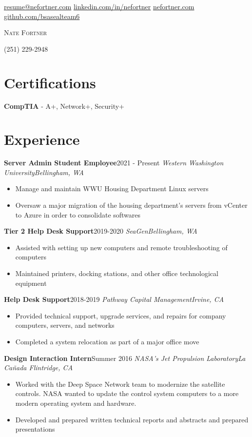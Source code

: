 \documentclass{article}
\newcommand{\alignicon}[2][nmbr]{\eqmakebox[#1]{\strut #2}}
\newcommand{\topLevelItem}[4]{
    \textbf{#1}\hfill #4\newline
    \emph{#2\hfill #3}\newline
    \vspace{-18pt}\begin{itemize}
}
\newcommand{\certificationType}[2]{
    \textbf{#1} - #2
}
\newcommand{\topLevelItemEnd}{\end{itemize}\vspace{5pt}}
\newcommand{\lowLevelItem}[1]{
    \item\small{#1}\vspace{-8pt}
}
\begin{document}
    \begin{center}
        \noindent\alignicon\faEnvelope\quad\href{mailto:resume@nefortner.com}{resume@nefortner.com}\hfill %
        \href{https://linkedin.com/in/nefortner}{linkedin.com/in/nefortner}\quad\alignicon\faLinkedin\newline %
        \alignicon\faGlobe\quad\href{https://nefortner.com}{nefortner.com}\hfill %
        \href{https://github.com/bsasealteam6}{github.com/bsasealteam6}\quad\alignicon\faGithub\vspace*{-0.33in} %
        
        {\fontsize{28}{0}\selectfont\scshape Nate Fortner}
    \end{center}
    \begin{center}
        (251) 229-2948\vspace{5pt}
    \end{center}
    \section*{Certifications}
        \certificationType{CompTIA}{A+, Network+, Security+}
    \section*{Experience}
        \topLevelItem{Server Admin Student Employee}{Western Washington University}{Bellingham, WA}{2021 - Present}
            \lowLevelItem{Manage and maintain WWU Housing Department Linux servers}
            \lowLevelItem{Oversaw a major migration of the housing department’s servers from vCenter to Azure in order to consolidate softwares}
        \topLevelItemEnd
        \topLevelItem{Tier 2 Help Desk Support}{SeaGen}{Bellingham, WA}{2019-2020}
            \lowLevelItem{Assisted with setting up new computers and remote troubleshooting of computers}
            \lowLevelItem{Maintained printers, docking stations, and other office technological equipment}
        \topLevelItemEnd
        \topLevelItem{Help Desk Support}{Pathway Capital Management}{Irvine, CA}{2018-2019}
            \lowLevelItem{Provided technical support, upgrade services, and repairs for company computers, servers, and networks}
            \lowLevelItem{Completed a system relocation as part of a major office move}
        \topLevelItemEnd
        \topLevelItem{Design Interaction Intern}{NASA's Jet Propulsion Laboratory}{La Ca\~{n}ada Flintridge, CA}{Summer 2016}
            \lowLevelItem{Worked with the Deep Space Network team to modernize the satellite controls. NASA wanted to update the control system computers to a more modern operating system and hardware.}
            \lowLevelItem{Developed and prepared written technical reports and abstracts and prepared presentations}
        \topLevelItemEnd
\end{document}
